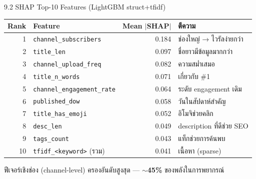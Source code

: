 \documentclass[aspectratio=169,11pt,xcolor=dvipsnames]{beamer}
\newcommand{\hl}[1]{\textcolor{kmitlOrange}{\textbf{#1}}}
\begin{document}
\begin{frame}{9.2 SHAP Top-10 Features (LightGBM struct+tfidf)}
  \footnotesize
  \begin{tabular}{rlrl}
    \toprule
    \textbf{Rank} & \textbf{Feature} & \textbf{Mean $|$SHAP$|$} & \textbf{ตีความ}\\
    \midrule
    1  & \texttt{channel\_subscribers}     & 0.184 & ช่องใหญ่ → ไวรัลง่ายกว่า\\
    2  & \texttt{title\_len}                & 0.097 & ชื่อยาวมีข้อมูลมากกว่า\\
    3  & \texttt{channel\_upload\_freq}     & 0.082 & ความสม่ำเสมอ\\
    4  & \texttt{title\_n\_words}           & 0.071 & เกี่ยวกับ \#1\\
    5  & \texttt{channel\_engagement\_rate} & 0.064 & ระดับ engagement เดิม\\
    6  & \texttt{published\_dow}            & 0.058 & วันในสัปดาห์สำคัญ\\
    7  & \texttt{title\_has\_emoji}         & 0.052 & อิโมจิช่วยคลิก\\
    8  & \texttt{desc\_len}                 & 0.049 & description ที่ดีช่วย SEO\\
    9  & \texttt{tags\_count}               & 0.043 & แท็กช่วยการค้นพบ\\
    10 & \texttt{tfidf\_<keyword>} (รวม)    & 0.041 & เนื้อหา (sparse)\\
    \bottomrule
  \end{tabular}
  \vspace{0.4em}
  \begin{center}
    \scriptsize ฟีเจอร์เชิงช่อง (channel-level) ครองอันดับสูงสุด — \hl{$\sim$45\%} ของพลังในการพยากรณ์
  \end{center}
\end{frame}
\end{document}

